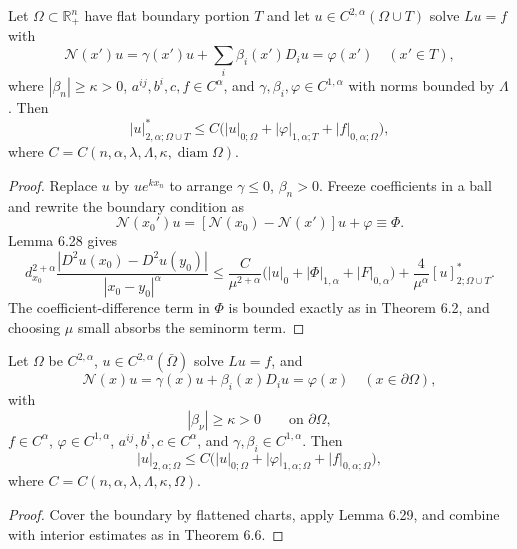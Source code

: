 \begin{lemma}
\label{gt-ch06-lem-6-29}
Let $\Omega\subset\mathbb R^n_+$ have flat boundary portion $T$ and let
$u\in C^{2,\alpha}(\Omega\cup T)$ solve $Lu=f$ with
\begin{equation}\tag{6.72}
\mathcal N(x')u=\gamma(x')u+\sum_i\beta_i(x')D_i u=\varphi(x')\quad(x'\in T),
\end{equation}
where $|\beta_n|\ge\kappa>0$, $a^{ij},b^i,c,f\in C^\alpha$, and
$\gamma,\beta_i,\varphi\in C^{1,\alpha}$ with norms bounded by $\Lambda$.  Then
\begin{equation}\tag{6.73}
|u|^*_{2,\alpha;\Omega\cup T}
\le C\bigl(|u|_{0;\Omega}+|\varphi|_{1,\alpha;T}+|f|_{0,\alpha;\Omega}\bigr),
\end{equation}
where $C=C(n,\alpha,\lambda,\Lambda,\kappa,\operatorname{diam}\Omega)$.
\end{lemma}
\begin{proof}
\sketch Replace $u$ by $ue^{kx_n}$ to arrange $\gamma\le0$, $\beta_n>0$.
Freeze coefficients in a ball and rewrite the boundary condition as
\begin{equation}\tag{6.74}
\mathcal N(x_0')u=[\mathcal N(x_0)-\mathcal N(x')]u+\varphi\equiv\Phi.
\end{equation}
Lemma 6.28 gives
\begin{equation}\tag{6.75}
d_{x_0}^{2+\alpha}\frac{|D^2u(x_0)-D^2u(y_0)|}{|x_0-y_0|^\alpha}
\le\frac{C}{\mu^{2+\alpha}}\bigl(|u|_0+|\Phi|_{1,\alpha}+|F|_{0,\alpha}\bigr)
+\frac4{\mu^\alpha}[u]^*_{2;\Omega\cup T}.
\end{equation}
The coefficient-difference term in $\Phi$ is bounded exactly as in Theorem
6.2, and choosing $\mu$ small absorbs the seminorm term.
\end{proof}

\begin{theorem}
\label{gt-ch06-thm-6-30}
Let $\Omega$ be $C^{2,\alpha}$, $u\in C^{2,\alpha}(\bar\Omega)$ solve $Lu=f$, and
\[
\mathcal N(x)u=\gamma(x)u+\beta_i(x)D_i u=\varphi(x)\quad(x\in\partial\Omega),
\]
with
\begin{equation}
\tag{6.76}
|\beta_\nu|\geq\kappa>0\qquad\text{on }\partial\Omega,
\end{equation}
$f\in C^\alpha$, $\varphi\in C^{1,\alpha}$,
$a^{ij},b^i,c\in C^\alpha$, and $\gamma,\beta_i\in C^{1,\alpha}$.  Then
\begin{equation}\tag{6.77}
|u|_{2,\alpha;\Omega}\le C\bigl(|u|_{0;\Omega}+|\varphi|_{1,\alpha;\Omega}+|f|_{0,\alpha;\Omega}\bigr),
\end{equation}
where $C=C(n,\alpha,\lambda,\Lambda,\kappa,\Omega)$.
\end{theorem}
\begin{proof}
\sketch Cover the boundary by flattened charts, apply Lemma 6.29, and combine
with interior estimates as in Theorem 6.6.
\end{proof}

